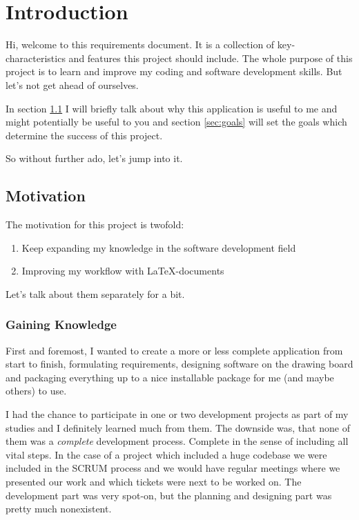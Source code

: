 \section{Introduction}
Hi, welcome to this requirements document. It is a collection of
key-characteristics and features this project should include. The whole purpose
of this project is to learn and improve my coding and software development
skills. But let's not get ahead of ourselves.

In section \ref{sec:motivation} I will briefly talk about why this application
is useful to me and might potentially be useful to you and section
\ref{sec:goals} will set the goals which determine the success of this project.

So without further ado, let's jump into it.


\subsection{Motivation}\label{sec:motivation}
The motivation for this project is twofold:

\begin{enumerate}
    \item Keep expanding my knowledge in the software development field
    \item Improving my workflow with {\LaTeX}-documents
\end{enumerate}

Let's talk about them separately for a bit.

\subsubsection*{Gaining Knowledge}
First and foremost, I wanted to create a more or less complete application from
start to {\glqq finish\grqq}, formulating requirements, designing software on
the drawing board and packaging everything up to a nice installable package for
me (and maybe others) to use.

I had the chance to participate in one or two development projects as part of
my studies and I definitely learned much from them. The downside was, that none
of them was a \emph{complete} development process. Complete in the sense of
including all vital steps. In the case of a project which included a huge
codebase we were included in the SCRUM process and we would have regular
meetings where we presented our work and which tickets were next to be worked
on. The development part was very spot-on, but the planning and designing part
was pretty much nonexistent.

